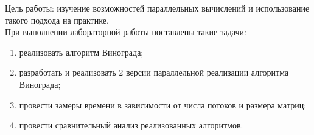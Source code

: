 \Introduction
Цель работы: изучение возможностей параллельных вычислений и использование такого подхода на практике.\\
При выполнении лабораторной работы поставлены такие задачи:
\begin{enumerate}[1)]
	\item реализовать алгоритм Винограда;
	\item разработать и реализовать 2 версии параллельной реализации алгоритма Винограда;
	\item провести замеры времени в зависимости от числа потоков и размера матриц;
	\item провести сравнительный анализ реализованных алгоритмов.
\end{enumerate}